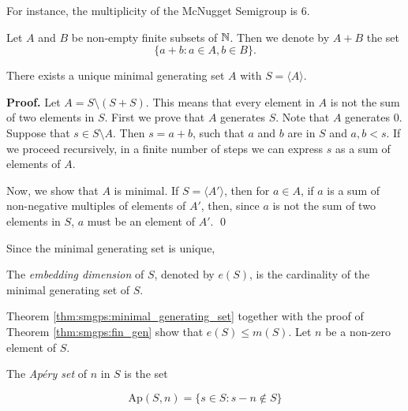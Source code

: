 For instance, the multiplicity of the McNugget Semigroup is 6. \par

Let $A$ and $B$ be non-empty finite subsets of $\mathbb{N}$. Then we denote by $A + B$ the set \[\{a + b : a \in A, b \in B\}.\] 

\begin{theorem}\label{thm:smgps:minimal_generating_set}
     There exists a unique minimal generating set $A$ with $S = \langle A \rangle$.
\end{theorem}

\textbf{Proof. } Let $A = S \setminus(S + S)$. This means that every element in $A$ is not the sum of two elements in $S$. First we prove that $A$ generates $S$. Note that $A$ generates 0. Suppose that $s\in S \setminus A$. Then $s = a + b$, such that $a$ and $b$ are in $S$ and $a, b < s$. If we proceed recursively, in a finite number of steps we can express $s$ as a sum of elements of $A$. \par

Now, we show that $A$ is minimal. If $S = \langle A' \rangle$, then for $a \in A$, if $a$ is a sum of non-negative multiples of elements of $A'$, then, since $a$ is not the sum of two elements in $S$, $a$ must be an element of $A'$. \qed \par

Since the minimal generating set is unique, \par

\begin{definition}\label{def:smgps:embedding_dim}
    The \textit{embedding dimension} of $S$, denoted by $e(S)$, is the cardinality of the minimal generating set of $S$.
\end{definition}

Theorem \ref{thm:smgps:minimal_generating_set} together with the proof of Theorem \ref{thm:smgps:fin_gen} show that $e(S) \leq m(S)$. Let $n$ be a non-zero element of $S$. \par

\begin{definition}\label{def:smgps:aperyset}
    The \textit{Ap\'ery set} of $n$ in $S$ is the set
\end{definition}
\[\text{Ap}(S, n) = \{s \in S : s - n \notin S\}\]

